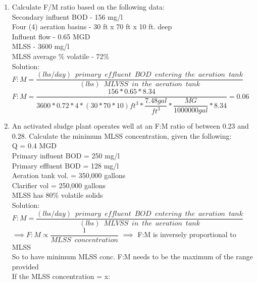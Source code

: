 \begin{enumerate}
\item Calculate F/M ratio based on the following data:\\
Secondary influent BOD - 156 mg/l\\
Four (4) aeration basins - 30 ft x 70 ft x 10 ft. deep\\
Influent flow - 0.65 MGD\\
MLSS - 3600 mg/l\\
MLSS average \% volatile - 72\%\\
Solution:\\
\vspace{0.3cm}
$F:M=\dfrac{(lbs/day) \enspace primary \enspace effluent  \enspace BOD \enspace entering \enspace the  \enspace aeration \enspace tank}{(lbs) \enspace MLVSS \enspace in \enspace the  \enspace aeration \enspace tank}$\\
\vspace{0.3cm}
$F:M=\dfrac{156*0.65*8.34}{3600*0.72*4*(30*70*10)ft^3* \dfrac{7.48gal}{ft^3}*\dfrac{MG}{1000000gal}*8.34}=\boxed{0.06}$\\
\pagebreak
\item An activated sludge plant operates well at an F:M ratio of between 0.23 and 0.28.  Calculate the minimum MLSS concentration, given the following:\\
Q = 0.4 MGD\\
Primary influent BOD = 250 mg/l\\
Primary effluent BOD = 128 mg/l\\
Aeration tank vol. = 350,000 gallons\\
Clarifier vol = 250,000 gallons\\
MLSS has 80\% volatile solids\\
Solution:\\
\vspace{0.3cm}
$F:M=\dfrac{(lbs/day) \enspace primary \enspace effluent  \enspace BOD \enspace entering \enspace the  \enspace aeration \enspace tank}{(lbs) \enspace MLVSS \enspace in \enspace the  \enspace aeration \enspace tank}$\\
\vspace{0.3cm}
$\implies F:M \propto \dfrac{1}{MLSS \enspace concentration}$  $\implies$ F:M is inversely proportional to MLSS\\
\vspace{0.3cm}
So to have minimum MLSS conc. F:M needs to be the maximum of the range provided\\
\vspace{0.3cm}
If the MLSS concentration = x:

\end{enumerate}
